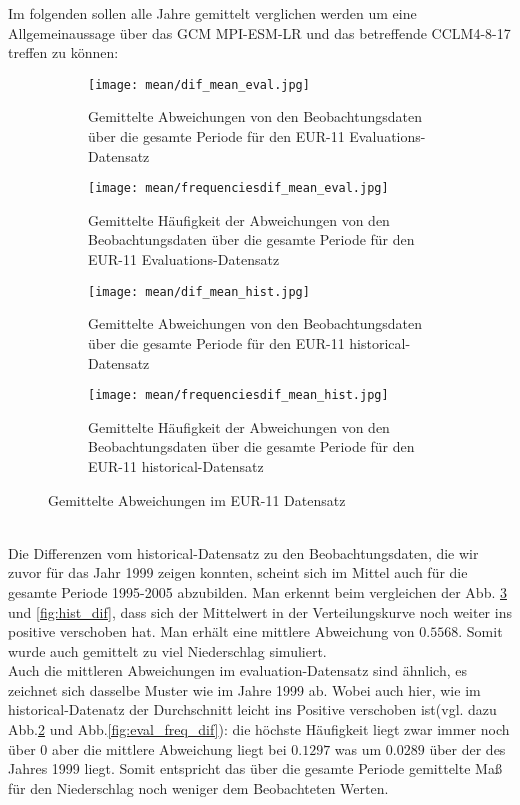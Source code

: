 Im folgenden sollen alle Jahre gemittelt verglichen werden um eine Allgemeinaussage über das GCM MPI-ESM-LR und das betreffende CCLM4-8-17 treffen zu können:\\
\begin{figure}[hbt!]
	\begin{subfigure}{0.49\textwidth}
	\centering
	\texttt{[image: mean/dif\_mean\_eval.jpg]}
	\caption{Gemittelte Abweichungen von den Beobachtungsdaten über die gesamte Periode für den EUR-11 Evaluations-Datensatz}
	\label{fig:mean_dif_eval}
	\end{subfigure}
	\begin{subfigure}{0.49\textwidth}
		\centering
		\texttt{[image: mean/frequenciesdif\_mean\_eval.jpg]}
		\caption{Gemittelte Häufigkeit der Abweichungen von den Beobachtungsdaten über die gesamte Periode für den EUR-11 Evaluations-Datensatz}
		\label{fig:freq_mean_dif_eval}
	\end{subfigure}
	\begin{subfigure}{0.49\textwidth}
	\centering
	\texttt{[image: mean/dif\_mean\_hist.jpg]}
	\caption{Gemittelte Abweichungen von den Beobachtungsdaten über die gesamte Periode für den EUR-11 historical-Datensatz}
	\label{fig:mean_dif_hist}
	\end{subfigure}
	\begin{subfigure}{0.49\textwidth}
			\centering
		\texttt{[image: mean/frequenciesdif\_mean\_hist.jpg]}
		\caption{Gemittelte Häufigkeit der Abweichungen von den Beobachtungsdaten über die gesamte Periode für den EUR-11  historical-Datensatz}
		\label{fig:freq_mean_dif_hist}
	\end{subfigure}
	\caption{Gemittelte Abweichungen im EUR-11 Datensatz}
\end{figure}
\\
Die Differenzen vom historical-Datensatz zu den Beobachtungsdaten, die wir zuvor für das Jahr 1999 zeigen konnten, scheint sich im Mittel auch für die gesamte Periode 1995-2005 abzubilden. Man erkennt beim vergleichen der Abb. \ref{fig:mean_dif_hist} und \ref{fig:hist_dif}, dass sich der Mittelwert in der Verteilungskurve noch weiter ins positive verschoben hat. Man erhält eine mittlere Abweichung von $0.5568$. Somit wurde auch gemittelt zu viel Niederschlag simuliert.\\
Auch die mittleren Abweichungen im evaluation-Datensatz sind ähnlich, es zeichnet sich dasselbe Muster wie im Jahre 1999 ab. Wobei auch hier, wie im historical-Datenatz der Durchschnitt leicht ins Positive verschoben ist(vgl. dazu Abb.\ref{fig:freq_mean_dif_eval} und Abb.\ref{fig:eval_freq_dif}): die höchste Häufigkeit liegt zwar immer noch über $0$ aber die mittlere Abweichung liegt bei $0.1297$ was um $0.0289$ über der des Jahres 1999 liegt. Somit entspricht das über die gesamte Periode gemittelte Maß für den Niederschlag noch weniger dem Beobachteten Werten.\\
